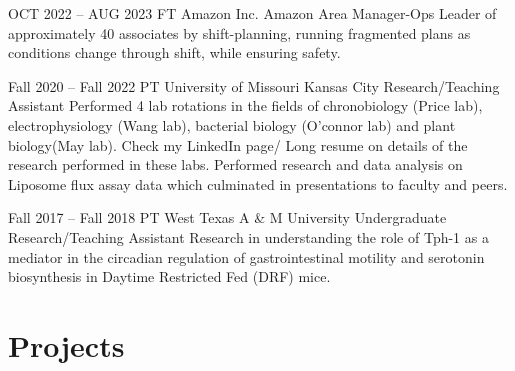 \documentclass[
	10pt, %
]{FreemanCV}
\begin{document}
\begin{paracol}{2}

\jobentry
	{ OCT 2022 --  AUG 2023} %
	{FT} %
	{Amazon Inc.} %
	{Amazon Area Manager-Ops} %
	{Leader of approximately 40 associates by shift-planning, running fragmented
plans as conditions change through shift, while ensuring safety.}
	

\jobentry
	{Fall 2020 -- Fall 2022} %
	{PT} %
	{University of Missouri Kansas City} %
	{Research/Teaching Assistant} %
	{Performed 4 lab rotations in the fields of chronobiology (Price lab), electrophysiology (Wang lab), bacterial biology (O'connor lab) and plant biology(May lab). Check my LinkedIn page/ Long resume on details of the research performed in these labs. Performed research and data analysis on Liposome flux assay data which culminated in presentations to faculty and peers.} %


\jobentry
	{Fall 2017 -- Fall 2018} %
	{PT} %
	{West Texas A \& M University} %
	{Undergraduate Research/Teaching Assistant} %
	{Research in understanding the role of Tph-1 as a mediator in the circadian regulation of gastrointestinal motility and serotonin biosynthesis in Daytime Restricted Fed (DRF) mice.}


\section{Projects}{\faClipboard}






\end{paracol}
\end{document}
